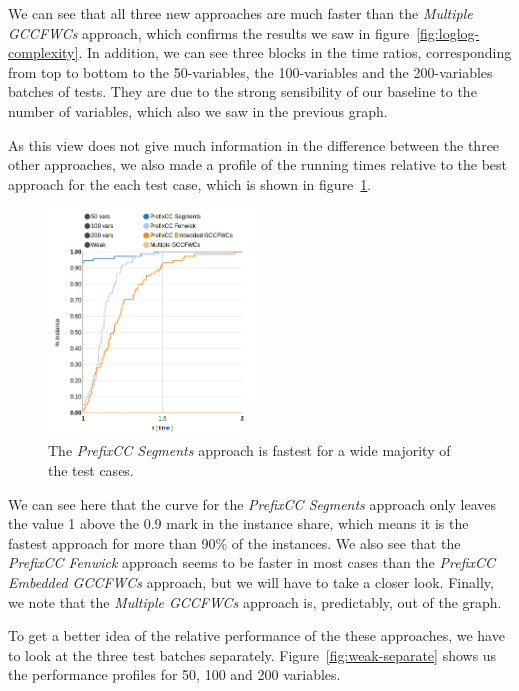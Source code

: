 \documentclass[a4paper,10pt]{article}
\begin{document}
We can see that all three new approaches are much faster than the \emph{Multiple GCCFWCs} approach, which confirms the results we saw in figure~\ref{fig:loglog-complexity}. In addition, we can see three blocks in the time ratios, corresponding from top to bottom to the 50-variables, the 100-variables and the 200-variables batches of tests. They are due to the strong sensibility of our baseline to the number of variables, which also we saw in the previous graph.

As this view does not give much information in the difference between the three other approaches, we also made a profile of the running times relative to the best approach for the each test case, which is shown in figure~\ref{fig:weak-all-time}.

\begin{figure}
    \centering
    \includegraphics[width=0.5\textwidth]{img/weak-all-time}
    \caption{The \emph{PrefixCC Segments} approach is fastest for a wide majority of the test cases.}
    \label{fig:weak-all-time}
\end{figure}

We can see here that the curve for the \emph{PrefixCC Segments} approach only leaves the value 1 above the $0.9$ mark in the instance share, which means it is the fastest approach for more than 90\% of the instances. We also see that the \emph{PrefixCC Fenwick} approach seems to be faster in most cases than the \emph{PrefixCC Embedded GCCFWCs} approach, but we will have to take a closer look. Finally, we note that the \emph{Multiple GCCFWCs} approach is, predictably, out of the graph.

To get a better idea of the relative performance of the these approaches, we have to look at the three test batches separately. Figure~\ref{fig:weak-separate} shows us the performance profiles for 50, 100 and 200 variables.
\end{document}
